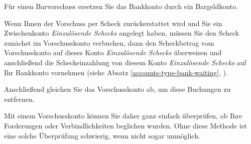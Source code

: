 Für einen Barvorschuss ersetzen Sie das Bankkonto durch ein Bargeldkonto.

Wenn Ihnen der Vorschuss per Scheck zurückerstattet wird und Sie ein Zwischenkonto \emph{Einzulösende Schecks} angelegt haben, müssen Sie den Scheck zunächst im Vorschusskonto verbuchen, dann den Scheckbetrag vom Vorschusskonto auf dieses Konto \emph{Einzulösende Schecks} überweisen und anschließend die Scheckeinzahlung von diesem Konto \emph{Einzulösende Schecks} auf Ihr Bankkonto vornehmen (siehe Absatz \vref{accounts-type-bank-waiting}, ).

Anschließend gleichen Sie das Vorschusskonto ab, um diese Buchungen zu entfernen.

Mit einem Vorschusskonto können Sie daher ganz einfach überprüfen, ob Ihre Forderungen oder Verbindlichkeiten beglichen wurden. Ohne diese Methode ist eine solche Überprüfung schwierig, wenn nicht sogar unmöglich.

